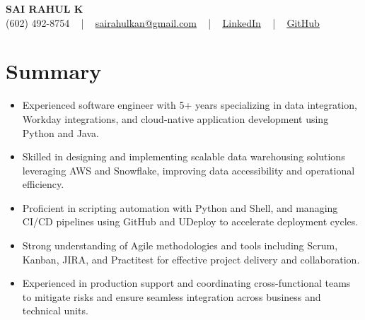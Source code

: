 \documentclass[letterpaper,11pt]{article}
\newcommand{\resumeItem}[1]{
  \item\footnotesize{
    {#1 \vspace{-2pt}}
  }
}
\newcommand{\resumeItemListStart}{\begin{itemize}[leftmargin=*]}
\newcommand{\resumeItemListEnd}{\end{itemize}\vspace{-5pt}}
\begin{document}
\begin{center}
    {\fontsize{14pt}{12pt}\selectfont \textbf{\MakeUppercase{Sai Rahul K}}}\\ \vspace{2pt}
    \fontsize{10pt}{12pt}\selectfont (602) 492-8754 ~ | ~ \href{mailto:sairahulkan@gmail.com}{sairahulkan@gmail.com} ~ | ~
    \href{https://www.linkedin.com/in/rq123/}{\color{blue}\underline{LinkedIn}} ~ | ~
    \href{https://github.com/kanrahuldo}{\color{blue}\underline{GitHub}}~
    \vspace{-8pt}
\end{center}

\section{Summary}
\fontsize{9pt}{10pt}\selectfont
\resumeItemListStart
    \resumeItem{Experienced software engineer with 5+ years specializing in data integration, Workday integrations, and cloud-native application development using Python and Java.}
    \resumeItem{Skilled in designing and implementing scalable data warehousing solutions leveraging AWS and Snowflake, improving data accessibility and operational efficiency.}
    \resumeItem{Proficient in scripting automation with Python and Shell, and managing CI/CD pipelines using GitHub and UDeploy to accelerate deployment cycles.}
    \resumeItem{Strong understanding of Agile methodologies and tools including Scrum, Kanban, JIRA, and Practitest for effective project delivery and collaboration.}
    \resumeItem{Experienced in production support and coordinating cross-functional teams to mitigate risks and ensure seamless integration across business and technical units.}
\resumeItemListEnd
\vspace{-6pt}
\end{document}
